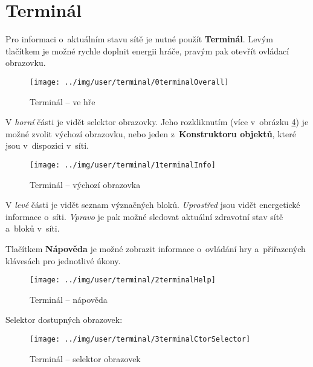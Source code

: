 
\section{Terminál}

Pro informaci o~aktuálním stavu sítě je nutné použít \textbf{Terminál}. Levým tlačítkem je možné rychle doplnit energii hráče, pravým pak otevřít ovládací obrazovku.

\begin{figure}[!ht]\centering
\texttt{[image: ../img/user/terminal/0terminalOverall]}

\caption{Terminál -- ve hře}
\label{fig:user_terminal_0terminalOverall}

\end{figure}

\FloatBarrier

V \textit{horní} části je vidět selektor obrazovky. Jeho rozkliknutím (více v~obrázku \ref{fig:user_terminal_3terminalCtorSelector}) je možné zvolit výchozí obrazovku, nebo jeden z~\textbf{Konstruktoru objektů}, které jsou v~dispozici v~síti.




\begin{figure}[!ht]\centering
\texttt{[image: ../img/user/terminal/1terminalInfo]}

\caption{Terminál -- výchozí obrazovka}
\label{fig:user_terminal_1terminalInfo}

\end{figure}

\FloatBarrier
V \textit{levé} části je vidět seznam význačných bloků. \textit{Uprostřed} jsou vidět energetické informace o~síti. \textit{Vpravo} je pak možné sledovat aktuální zdravotní stav sítě a~bloků v~síti.

Tlačítkem \textbf{Nápověda} je možné zobrazit informace o~ovládání hry a~přiřazených klávesách pro jednotlivé úkony.

\begin{figure}[!ht]\centering
\texttt{[image: ../img/user/terminal/2terminalHelp]}

\caption{Terminál -- nápověda}
\label{fig:user_terminal_2terminalHelp}

\end{figure}

\FloatBarrier

Selektor dostupných obrazovek:

\begin{figure}[!ht]\centering
\texttt{[image: ../img/user/terminal/3terminalCtorSelector]}

\caption{Terminál -- selektor obrazovek}
\label{fig:user_terminal_3terminalCtorSelector}

\end{figure}

